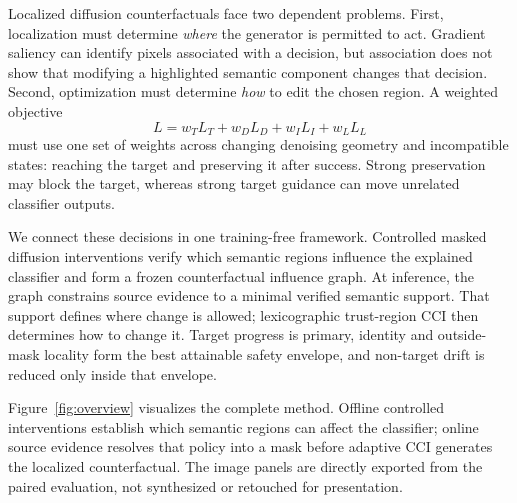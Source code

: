 \documentclass[10pt,twocolumn]{article}
\begin{document}
Localized diffusion counterfactuals face two dependent problems. First,
localization must determine \emph{where} the generator is permitted to act.
Gradient saliency can identify pixels associated with a decision, but
association does not show that modifying a highlighted semantic component
changes that decision. Second, optimization must determine \emph{how} to edit
the chosen region. A weighted objective
\begin{equation}
 L=w_TL_T+w_DL_D+w_IL_I+w_LL_L
 \label{eq:weighted}
\end{equation}
must use one set of weights across changing denoising geometry and incompatible
states: reaching the target and preserving it after success. Strong
preservation may block the target, whereas strong target guidance can move
unrelated classifier outputs.

We connect these decisions in one training-free framework. Controlled masked
diffusion interventions verify which semantic regions influence the explained
classifier and form a frozen counterfactual influence graph. At inference,
the graph constrains source evidence to a minimal verified semantic support.
That support defines where change is allowed; lexicographic trust-region CCI
then determines how to change it. Target progress is primary, identity and
outside-mask locality form the best attainable safety envelope, and
non-target drift is reduced only inside that envelope.

Figure~\ref{fig:overview} visualizes the complete method. Offline controlled
interventions establish which semantic regions can affect the classifier;
online source evidence resolves that policy into a mask before adaptive CCI
generates the localized counterfactual. The image panels are directly exported
from the paired evaluation, not synthesized or retouched for presentation.
\end{document}
